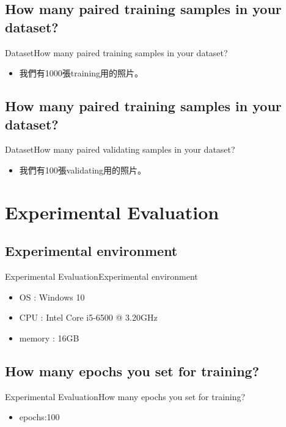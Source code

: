 \documentclass{beamer}
\begin{document}
\begin{CJK*}{UTF8}{bsmi}
\subsection*{How many paired training samples in your dataset?}
\begin{frame}{Dataset}{How many paired training samples in your dataset?}
  \begin{itemize}
  \item {
   我們有1000張training用的照片。
  }
  \end{itemize}
\end{frame}
\subsection*{How many paired training samples in your dataset?}
\begin{frame}{Dataset}{How many paired validating samples in your dataset?}
  \begin{itemize}
  \item {
   我們有100張validating用的照片。
  }
  \end{itemize}
\end{frame}

\section{Experimental Evaluation}
\subsection*{Experimental environment}
\begin{frame}{Experimental Evaluation}{Experimental environment}
  \begin{itemize}
  \item {
   OS : Windows 10
  }
  \item {
   CPU : Intel Core i5-6500 @ 3.20GHz
  }
  \item {
   memory : 16GB
  }
  \end{itemize}
\end{frame}
\subsection*{How many epochs you set for training?}
\begin{frame}{Experimental Evaluation}{How many epochs you set for training?}
  \begin{itemize}
  \item {
  epochs:100
  }
  \end{itemize}
\end{frame}


\end{CJK*}
\end{document}
